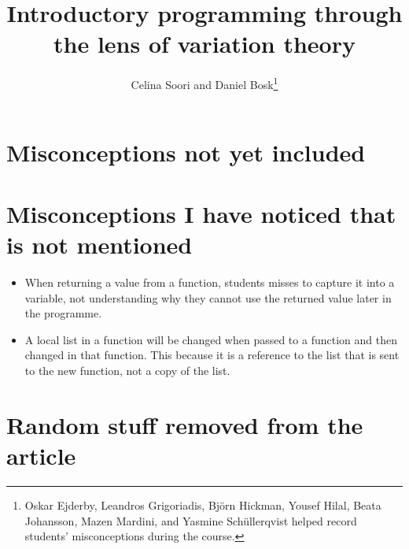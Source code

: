 \documentclass[onecolumn]{article}
\title{%
  Introductory programming through the lens of variation theory%
}
\author{%
  Celina Soori and
  Daniel Bosk\thanks{%
    Oskar Ejderby,
    Leandros Grigoriadis,
    Björn Hickman,
    Yousef Hilal,
    Beata Johansson,
    Mazen Mardini, and
    Yasmine Schüllerqvist
    helped record students' misconceptions during the course.
  }%
}
\begin{document}

\maketitle
\begin{abstract}
  
\end{abstract}

\clearpage
\tableofcontents
\clearpage


















\printbibliography

\appendix

\section{Misconceptions not yet included}




\section{Misconceptions I have noticed that is not mentioned}

\begin{itemize}
    \item When returning a value from a function, students misses to 
capture it into a variable, not understanding why they cannot use the 
returned value later in the programme. 
    \item A local list in a function will be changed when passed to a 
function and then changed in that function. This because it is a 
reference to the list that is sent to the new function, not a copy of 
the list. 
\end{itemize}

\section{Random stuff removed from the article}
\end{document}
